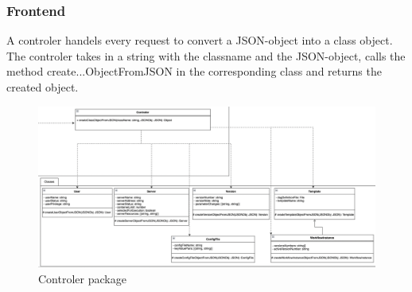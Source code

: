     \subsubsection{Frontend}
    	A controler handels every request to convert a JSON-object into a class object.
    	The controler takes in a string with the classname and the JSON-object, calls the 
    	method create...ObjectFromJSON in the corresponding class and returns the created object. 
    	\begin{figure}[H]
            \label{API}
            \centerline{\includegraphics[scale=0.5]{res/Controler.png}}
            \caption{Controler package}
    	\end{figure}
